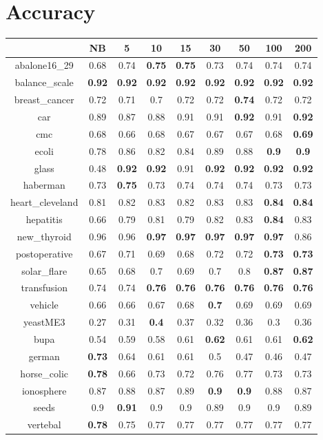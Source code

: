 \documentclass{article}%
\begin{document}
%
\normalsize%
\section*{Accuracy}%
\begin{tabular}{c|cccccccc}%
\hline%
&NB&5&10&15&30&50&100&200\\%
\hline%
abalone16\_29&0.68&0.74&\textbf{0.75}&\textbf{0.75}&0.73&0.74&0.74&0.74\\%
\hline%
balance\_scale&\textbf{0.92}&\textbf{0.92}&\textbf{0.92}&\textbf{0.92}&\textbf{0.92}&\textbf{0.92}&\textbf{0.92}&\textbf{0.92}\\%
\hline%
breast\_cancer&0.72&0.71&0.7&0.72&0.72&\textbf{0.74}&0.72&0.72\\%
\hline%
car&0.89&0.87&0.88&0.91&0.91&\textbf{0.92}&0.91&\textbf{0.92}\\%
\hline%
cmc&0.68&0.66&0.68&0.67&0.67&0.67&0.68&\textbf{0.69}\\%
\hline%
ecoli&0.78&0.86&0.82&0.84&0.89&0.88&\textbf{0.9}&\textbf{0.9}\\%
\hline%
glass&0.48&\textbf{0.92}&\textbf{0.92}&0.91&\textbf{0.92}&\textbf{0.92}&\textbf{0.92}&\textbf{0.92}\\%
\hline%
haberman&0.73&\textbf{0.75}&0.73&0.74&0.74&0.74&0.73&0.73\\%
\hline%
heart\_cleveland&0.81&0.82&0.83&0.82&0.83&0.83&\textbf{0.84}&\textbf{0.84}\\%
\hline%
hepatitis&0.66&0.79&0.81&0.79&0.82&0.83&\textbf{0.84}&0.83\\%
\hline%
new\_thyroid&0.96&0.96&\textbf{0.97}&\textbf{0.97}&\textbf{0.97}&\textbf{0.97}&\textbf{0.97}&0.86\\%
\hline%
postoperative&0.67&0.71&0.69&0.68&0.72&0.72&\textbf{0.73}&\textbf{0.73}\\%
\hline%
solar\_flare&0.65&0.68&0.7&0.69&0.7&0.8&\textbf{0.87}&\textbf{0.87}\\%
\hline%
transfusion&0.74&0.74&\textbf{0.76}&\textbf{0.76}&\textbf{0.76}&\textbf{0.76}&\textbf{0.76}&\textbf{0.76}\\%
\hline%
vehicle&0.66&0.66&0.67&0.68&\textbf{0.7}&0.69&0.69&0.69\\%
\hline%
yeastME3&0.27&0.31&\textbf{0.4}&0.37&0.32&0.36&0.3&0.36\\%
\hline%
bupa&0.54&0.59&0.58&0.61&\textbf{0.62}&0.61&0.61&\textbf{0.62}\\%
\hline%
german&\textbf{0.73}&0.64&0.61&0.61&0.5&0.47&0.46&0.47\\%
\hline%
horse\_colic&\textbf{0.78}&0.66&0.73&0.72&0.76&0.77&0.73&0.73\\%
\hline%
ionosphere&0.87&0.88&0.87&0.89&\textbf{0.9}&\textbf{0.9}&0.88&0.87\\%
\hline%
seeds&0.9&\textbf{0.91}&0.9&0.9&0.89&0.9&0.9&0.89\\%
\hline%
vertebal&\textbf{0.78}&0.75&0.77&0.77&0.77&0.77&0.77&0.77\\%
\hline%
\end{tabular}
\end{document}
